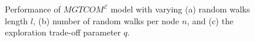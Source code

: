 \begin{figure}[ht!]
\centering
{}\quad
{}\quad
{}\quad
\caption{
Performance of $MGTCOM^{\mathcal{E}}$ model with varying (a) random walks length $l$, (b) number of random walks per node $n$, and (c) the exploration trade-off parameter $q$.
}
\label{fig:hyp_rw_topo}
\end{figure}    